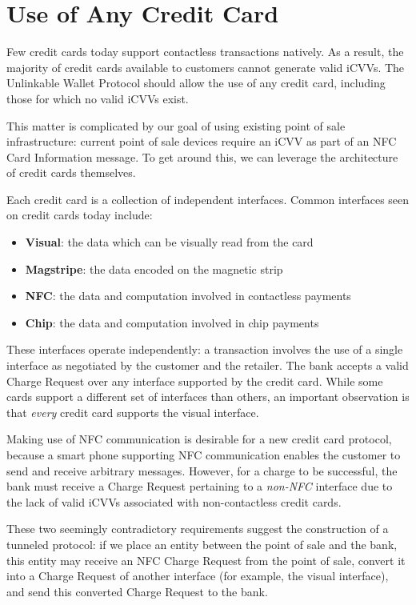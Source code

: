 \section{Use of Any Credit Card}
\label{sec:goals-anycard}

Few credit cards today support contactless transactions natively.
As a result, the majority of credit cards available to customers cannot generate valid iCVVs.
The Unlinkable Wallet Protocol should allow the use of any credit card, including those for which no valid iCVVs exist.

This matter is complicated by our goal of using existing point of sale infrastructure:
    current point of sale devices require an iCVV as part of an NFC Card Information message.
To get around this, we can leverage the architecture of credit cards themselves.

Each credit card is a collection of independent interfaces.
Common interfaces seen on credit cards today include:

\begin{itemize}
\item \textbf{Visual}: the data which can be visually read from the card
\item \textbf{Magstripe}: the data encoded on the magnetic strip
\item \textbf{NFC}: the data and computation involved in contactless payments
\item \textbf{Chip}: the data and computation involved in chip payments
\end{itemize}

These interfaces operate independently:
    a transaction involves the use of a single interface as negotiated by the customer and the retailer.
The bank accepts a valid Charge Request over any interface supported by the credit card.
While some cards support a different set of interfaces than others, an important observation is that \emph{every} credit card supports the visual interface.

Making use of NFC communication is desirable for a new credit card protocol,
    because a smart phone supporting NFC communication enables the customer to send and receive arbitrary messages.
However, for a charge to be successful, the bank must receive a Charge Request pertaining to a \emph{non-NFC} interface due to the lack of valid iCVVs associated with non-contactless credit cards.

These two seemingly contradictory requirements suggest the construction of a tunneled protocol:
    if we place an entity between the point of sale and the bank, this entity may receive an NFC Charge Request from the point of sale,
    convert it into a Charge Request of another interface (for example, the visual interface),
    and send this converted Charge Request to the bank.
